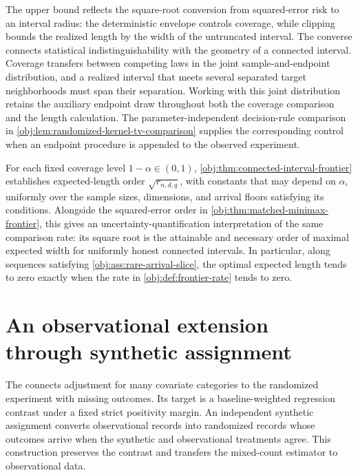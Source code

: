 \documentclass[11pt]{article}
\begin{document}
The upper bound reflects the square-root conversion from squared-error risk to an interval radius: the deterministic envelope controls coverage, while clipping bounds the realized length by the width of the untruncated interval. The converse connects statistical indistinguishability with the geometry of a connected interval. Coverage transfers between competing laws in the joint sample-and-endpoint distribution, and a realized interval that meets several separated target neighborhoods must span their separation. Working with this joint distribution retains the auxiliary endpoint draw throughout both the coverage comparison and the length calculation. The parameter-independent decision-rule comparison in \cref{obj:lem:randomized-kernel-tv-comparison} supplies the corresponding control when an endpoint procedure is appended to the observed experiment.

For each fixed coverage level \(1-\alpha\in(0,1)\), \cref{obj:thm:connected-interval-frontier} establishes expected-length order \(\sqrt{r_{n,d,q}}\), with constants that may depend on \(\alpha\), uniformly over the sample sizes, dimensions, and arrival floors satisfying its conditions. Alongside the squared-error order in \cref{obj:thm:matched-minimax-frontier}, this gives an uncertainty-quantification interpretation of the same comparison rate: its square root is the attainable and necessary order of maximal expected width for uniformly honest connected intervals. In particular, along sequences satisfying \cref{obj:ass:rare-arrival-slice}, the optimal expected length tends to zero exactly when the rate in \cref{obj:def:frontier-rate} tends to zero.


\section{An observational extension through synthetic assignment}

The  connects adjustment for many covariate categories to the randomized experiment with missing outcomes. Its target is a baseline-weighted regression contrast under a fixed strict positivity margin. An independent synthetic assignment converts observational records into randomized records whose outcomes arrive when the synthetic and observational treatments agree. This construction preserves the contrast and transfers the mixed-count estimator to observational data.
\end{document}
